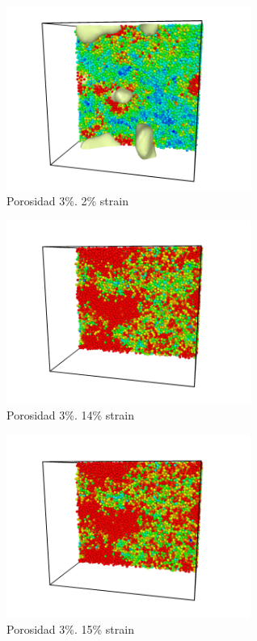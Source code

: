 \documentclass[10pt, oneside]{article} %
\begin{document}
\begin{figure}[H]
\centering
\includegraphics[width=8cm]{Figures/Porosidad/5_2strain_color.png}
\caption{Porosidad 3\%. 2\% strain}
\end{figure}

\begin{figure}[H]
\centering
\includegraphics[width=8cm]{Figures/Porosidad/5_14strain_color.png}
\caption{Porosidad 3\%. 14\% strain}
\end{figure}

\begin{figure}[H]
\centering
\includegraphics[width=8cm]{Figures/Porosidad/5_15strain_color.png}
\caption{Porosidad 3\%. 15\% strain}
\end{figure}
\end{document}
